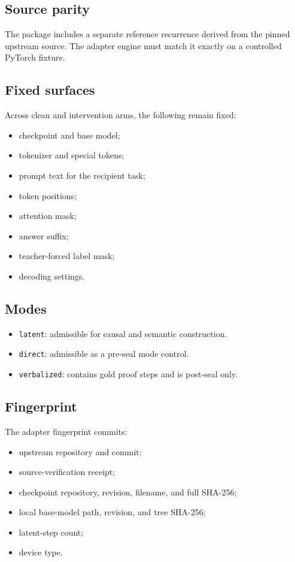 \documentclass[
  10pt,
]{article}
\providecommand{\tightlist}{%
  \setlength{\itemsep}{0pt}\setlength{\parskip}{0pt}}
\begin{document}
\subsection{Source parity}\label{source-parity}

The package includes a separate reference recurrence derived from the
pinned upstream source. The adapter engine must match it exactly on a
controlled PyTorch fixture.

\subsection{Fixed surfaces}\label{fixed-surfaces}

Across clean and intervention arms, the following remain fixed:

\begin{itemize}
\tightlist
\item
  checkpoint and base model;
\item
  tokenizer and special tokens;
\item
  prompt text for the recipient task;
\item
  token positions;
\item
  attention mask;
\item
  answer suffix;
\item
  teacher-forced label mask;
\item
  decoding settings.
\end{itemize}

\subsection{Modes}\label{modes}

\begin{itemize}
\tightlist
\item
  \texttt{latent}: admissible for causal and semantic construction.
\item
  \texttt{direct}: admissible as a pre-seal mode control.
\item
  \texttt{verbalized}: contains gold proof steps and is post-seal only.
\end{itemize}

\subsection{Fingerprint}\label{fingerprint}

The adapter fingerprint commits:

\begin{itemize}
\tightlist
\item
  upstream repository and commit;
\item
  source-verification receipt;
\item
  checkpoint repository, revision, filename, and full SHA-256;
\item
  local base-model path, revision, and tree SHA-256;
\item
  latent-step count;
\item
  device type.
\end{itemize}
\end{document}

